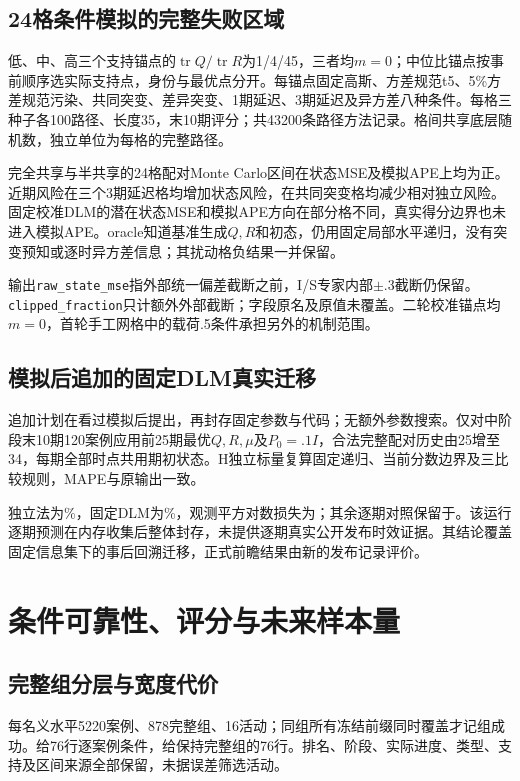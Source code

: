 \subsection{24格条件模拟的完整失败区域}
低、中、高三个支持锚点的\(\operatorname{tr}Q/\operatorname{tr}R\)为1/4/45，三者均\(m=0\)；中位比锚点按事前顺序选实际支持点，身份与最优点分开。每锚点固定高斯、方差规范t5、5\%方差规范污染、共同突变、差异突变、1期延迟、3期延迟及异方差八种条件。每格三种子各100路径、长度35，末10期评分；共43200条路径方法记录。格间共享底层随机数，独立单位为每格的完整路径。


完全共享与半共享的24格配对Monte Carlo区间在状态MSE及模拟APE上均为正。近期风险在三个3期延迟格均增加状态风险，在共同突变格均减少相对独立风险。固定校准DLM的潜在状态MSE和模拟APE方向在部分格不同，真实得分边界也未进入模拟APE。oracle知道基准生成\(Q,R\)和初态，仍用固定局部水平递归，没有突变预知或逐时异方差信息；其扰动格负结果一并保留。

输出\texttt{raw\_state\_mse}指外部统一偏差截断之前，I/S专家内部\(\pm.3\)截断仍保留。\texttt{clipped\_fraction}只计额外外部截断；字段原名及原值未覆盖。二轮校准锚点均\(m=0\)，首轮手工网格中的载荷.5条件承担另外的机制范围。

\subsection{模拟后追加的固定DLM真实迁移}
追加计划在看过模拟后提出，再封存固定参数与代码；无额外参数搜索。仅对中阶段末10期120案例应用前25期最优\(Q,R,\mu\)及\(P_0=.1I\)，合法完整配对历史由25增至34，每期全部时点共用期初状态。H独立标量复算固定递归、当前分数边界及三比较规则，MAPE与原输出一致。

独立法为\DTransferI\%，固定DLM为\DTransfer\%，观测平方对数损失为\DTransferLog；其余逐期对照保留于。该运行逐期预测在内存收集后整体封存，未提供逐期真实公开发布时效证据。其结论覆盖固定信息集下的事后回溯迁移，正式前瞻结果由新的发布记录评价。

\section{条件可靠性、评分与未来样本量}\label{sec:round2reliability}
\subsection{完整组分层与宽度代价}
每名义水平5220案例、878完整组、16活动；同组所有冻结前缀同时覆盖才记组成功。给76行逐案例条件，给保持完整组的76行。排名、阶段、实际进度、类型、支持及区间来源全部保留，未据误差筛选活动。



